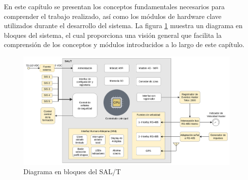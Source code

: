 En este capítulo se presentan los conceptos fundamentales necesarios para comprender el trabajo realizado, así como los módulos de hardware clave utilizados durante el desarrollo del sistema. La figura \ref{fig:diagrama_bloques} muestra un diagrama en bloques del sistema, el cual proporciona una visión general que facilita la comprensión de los conceptos y módulos introducidos a lo largo de este capítulo.

\begin{figure}[H]
    \centering
    \includegraphics[width=\linewidth]{img/diagrama_bloques.png}
    \caption{Diagrama en bloques del SAL/T}
    \label{fig:diagrama_bloques}
\end{figure}
